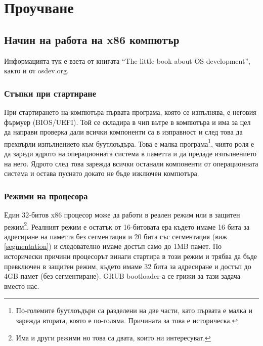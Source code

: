 \section{Проучване} \label{research}
\subsection{Начин на работа на x86 компютър}
Информацията тук е взета от книгата ``The little book about OS development''\parencite{osbook}, както и от osdev.org\parencite{oswiki}.
\subsubsection{Стъпки при стартиране}
При стартирането на компютъра първата програма, която се изпълнява, е неговия фърмуер (BIOS/UEFI). Той се складира в чип вътре в компютъра и има за цел да направи проверка дали всички компоненти са в изправност и след това да прехвърли изпълнението към буутлоъдъра. Това е малка програма\footnote{По-големите буутлоъдъри са разделени на две части, като първата е малка и зарежда втората, която е по-голяма. Причината за това е историческа.}, чиято роля е да зареди ядрото на операционната система в паметта и да предаде изпълнението на него. Ядрото след това зарежда всички останали компоненти от операционната система и остава пуснато докато не бъде изключен компютъра.

\subsubsection{Режими на процесора} \label{processormodes}
Един 32-битов x86 процесор може да работи в реален режим или в защитен режим\footnote{Има и други режими но това са двата, които ни интересуват.}. Реалният режим е остатък от 16-битовата ера където имаме 16 бита за адресиране на паметта без сегментация и 20 бита със сегментация (виж \ref{segmentation}) и следователно имаме достъп само до 1MB памет. По исторически причини процесорът винаги стартира в този режим и трябва да бъде превключен в защитен режим, където имаме 32 бита за адресиране и достъп до 4GB памет (без сегментиране). GRUB bootloader-а се грижи за тази задача вместо нас.

